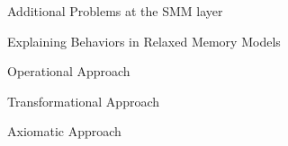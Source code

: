\documentclass[xcolor={dvipsnames}]{beamer}
\begin{document}
    \begin{frame}{Additional Problems at the SMM layer}
    \end{frame}

    \begin{frame}{Explaining Behaviors in Relaxed Memory Models}
        
    \end{frame}

    \begin{frame}{Operational Approach}
        
    \end{frame}

    \begin{frame}{Transformational Approach}
        
    \end{frame}

    \begin{frame}{Axiomatic Approach}
        
    \end{frame}
\end{document}
